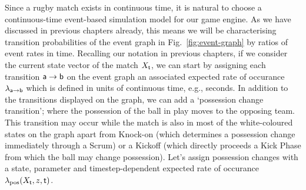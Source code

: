 Since a rugby match exists in continuous time, it is natural to choose a continuous-time event-based simulation model for our game engine. As we have discussed in previous chapters already, this means we will be characterising transition probabilities of the event graph in Fig.~\ref{fig:event-graph} by ratios of event rates in time. Recalling our notation in previous chapters, if we consider the current state vector of the match $X_{\sf t}$, we can start by assigning each transition ${\sf a}\rightarrow {\sf b}$ on the event graph an associated expected rate of occurance $\lambda_{{\sf a}\rightarrow {\sf b}}$ which is defined in units of continuous time, e.g., seconds. In addition to the transitions displayed on the graph, we can add a `possession change transition'; where the possession of the ball in play moves to the opposing team. This transition may occur while the match is also in most of the white-coloured states on the graph apart from {\sf Knock-on} (which determines a possession change immediately through a {\sf Scrum}) or a {\sf Kickoff} (which directly proceeds a {\sf Kick Phase} from which the ball may change possession). Let's assign possession changes with a state, parameter and timestep-dependent expected rate of occurance $\lambda_{\rm pos}(X_{\sf t}, z, {\sf t})$.

